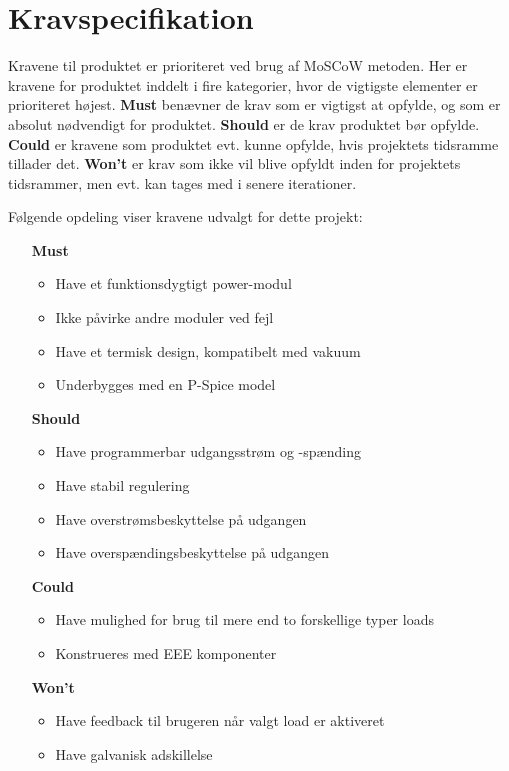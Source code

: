 \chapter{Kravspecifikation}

Kravene til produktet er prioriteret ved brug af MoSCoW metoden. Her er kravene for produktet inddelt i fire kategorier, hvor de vigtigste elementer er prioriteret højest. \textbf{Must} benævner de krav som er vigtigst at opfylde, og som er absolut nødvendigt for produktet. \textbf{Should} er de krav produktet bør opfylde. \textbf{Could} er kravene som produktet evt. kunne opfylde, hvis projektets tidsramme tillader det. \textbf{Won't} er krav som ikke vil blive opfyldt inden for projektets tidsrammer, men evt. kan tages med i senere iterationer.

\noindent Følgende opdeling viser kravene udvalgt for dette projekt:
\begin{itemize}
	\item[\textbf{Must}]
		\begin{itemize}
			\item Have et funktionsdygtigt power-modul
			\item Ikke påvirke andre moduler ved fejl
			\item Have et termisk design, kompatibelt med vakuum
			\item Underbygges med en P-Spice model

		\end{itemize}
	\item[\textbf{Should}]
		\begin{itemize}
			\item Have programmerbar udgangsstrøm og -spænding
			\item Have stabil regulering
			\item Have overstrømsbeskyttelse på udgangen
			\item Have overspændingsbeskyttelse på udgangen

		\end{itemize}
	\item[\textbf{Could}] 
		\begin{itemize}
			\item Have mulighed for brug til mere end to forskellige typer loads
			\item Konstrueres med EEE komponenter

		\end{itemize}
	\item[\textbf{Won't}]
		\begin{itemize}
			\item Have feedback til brugeren når valgt load er aktiveret
			\item Have galvanisk adskillelse
			
		\end{itemize}
\end{itemize}


